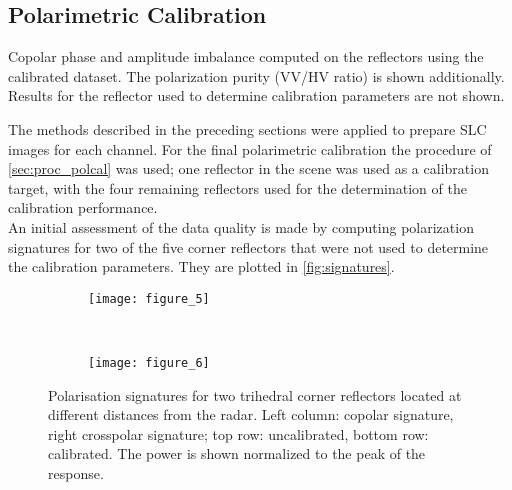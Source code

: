 \subsection{Polarimetric Calibration}\label{sec:res_polcal}

								
\begin{table}[h]
	\centering
	\caption{Copolar phase and amplitude imbalance computed on the reflectors using the calibrated dataset. The polarization purity (VV/HV ratio) is shown additionally. Results for the reflector used to determine calibration parameters are not shown.}
	\label{tab:polcal}
\end{table}		
The methods described in the preceding sections were applied to prepare SLC images for each channel. For the final polarimetric calibration the procedure of \autoref{sec:proc_polcal} was used; one reflector in the scene was used as a calibration target, with the four remaining reflectors used for the determination of the calibration performance.\\
An initial assessment of the data quality is made  by computing polarization signatures\cite{VanZyl1987} for two of the five corner reflectors that were not used to determine the calibration parameters. They are plotted in \autoref{fig:signatures}.
\begin{figure*}[hb]
	\centering
	\begin{subfigure}[t]{\textwidth}
	\centering
	\texttt{[image: figure\_5]}
	\label{fig:signatures:near}
	\end{subfigure}\\
	\begin{subfigure}[t]{\textwidth}
	\centering
	\texttt{[image: figure\_6]}
	\label{fig:signatures:far}
	\end{subfigure}
	\caption{Polarisation signatures for two trihedral corner reflectors located at different distances from the radar. Left column: copolar signature, right crosspolar signature; top row: uncalibrated, bottom row: calibrated. The power is shown normalized to the peak of the response.}
	\label{fig:signatures}
\end{figure*}

